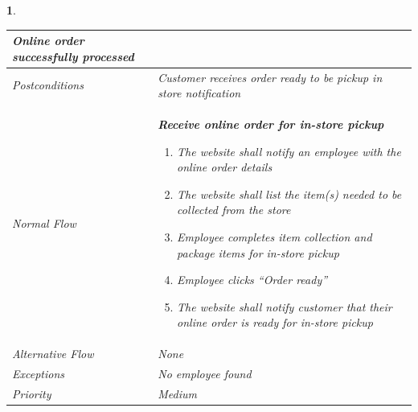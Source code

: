 \documentclass{scrreprt}
\theoremstyle{funreq}
\newtheorem{funreq}{}
\begin{document}
\begin{funreq}
\begin{table}[H]
{\begin{tabularx}{\columnwidth}{|l|X|}
					Online order successfully processed
					\\ \hline Postconditions   & 
					Customer receives order ready to be pickup in store notification
					\\ \hline Normal Flow &
					\bfseries{Receive online order for in-store pickup}\normalfont\newline 
					\begin{enumerate}
					    \item The website shall notify an employee with the online order details
					    \item The website shall list the item(s) needed to be collected from the store
                        \item Employee completes item collection and package items for in-store pickup
                        \item Employee clicks “Order ready”
                        \item The website shall notify customer that their online order is ready for in-store pickup
					\end{enumerate}
					\\ \hline Alternative Flow & 
					None
					\\ \hline Exceptions & 
					No employee found
					\\ \hline Priority & 
					Medium
					\\ \hline
				\end{tabularx}%
			}
		\end{table}
	\end{funreq}

	
	
\end{document}
